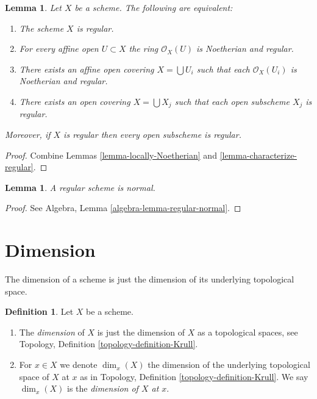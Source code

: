 \documentclass{stacks-project}
\theoremstyle{plain}
\newtheorem{lemma}[subsection]{Lemma}
\theoremstyle{definition}
\newtheorem{definition}[subsection]{Definition}
\theoremstyle{remark}
\numberwithin{equation}{subsection}
\begin{document}
\begin{lemma}
\label{lemma-locally-regular}
Let $X$ be a scheme. The following are equivalent:
\begin{enumerate}
\item The scheme $X$ is regular.
\item For every affine open $U \subset X$ the ring $\mathcal{O}_X(U)$
is Noetherian and regular.
\item There exists an affine open covering $X = \bigcup U_i$ such that
each $\mathcal{O}_X(U_i)$ is Noetherian and regular.
\item There exists an open covering $X = \bigcup X_j$
such that each open subscheme $X_j$ is regular.
\end{enumerate}
Moreover, if $X$ is regular then every open subscheme is regular.
\end{lemma}

\begin{proof}
Combine Lemmas \ref{lemma-locally-Noetherian}
and \ref{lemma-characterize-regular}.
\end{proof}

\begin{lemma}
\label{lemma-regular-normal}
A regular scheme is normal.
\end{lemma}

\begin{proof}
See
Algebra, Lemma \ref{algebra-lemma-regular-normal}.
\end{proof}




\section{Dimension}
\label{section-dimension}

\noindent
The dimension of a scheme is just the dimension of its underlying
topological space.

\begin{definition}
\label{definition-dimension}
Let $X$ be a scheme.
\begin{enumerate}
\item The {\it dimension} of $X$ is just the dimension of $X$
as a topological spaces, see
Topology, Definition \ref{topology-definition-Krull}.
\item For $x \in X$ we denote $\dim_x(X)$ the dimension of the underlying
topological space of $X$ at $x$ as in
Topology, Definition \ref{topology-definition-Krull}.
We say $\dim_x(X)$ is the {\it dimension of $X$ at $x$}.
\end{enumerate}
\end{definition}
\end{document}
